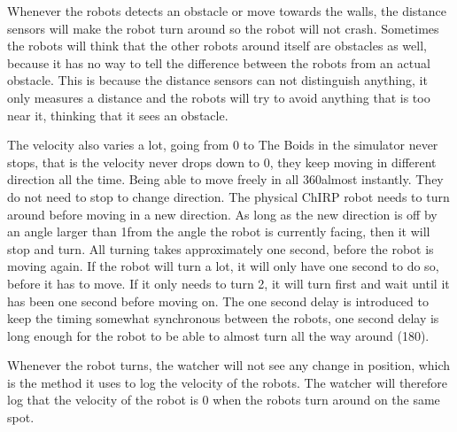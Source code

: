 Whenever the robots detects an obstacle or move towards the walls, the distance sensors will make the robot turn around so the robot will not crash. Sometimes the robots will think that the other robots around itself are obstacles as well, because it has no way to tell the difference between the robots from an actual obstacle. This is because the distance sensors can not distinguish anything, it only measures a distance and the robots will try to avoid anything that is too near it, thinking that it sees an obstacle.

The velocity also varies a lot, going from 0 to %
The Boids in the simulator never stops, that is the velocity never drops down to 0, they keep moving in different direction all the time. Being able to move freely in all 360\textdegree almost instantly. They do not need to stop to change direction.
The physical ChIRP robot needs to turn around before moving in a new direction. As long as the new direction is off by an angle larger than 1\textdegree from the angle the robot is currently facing, then it will stop and turn. All turning takes approximately one second, before the robot is moving again. If the robot will turn a lot, it will only have one second to do so, before it has to move. If it only needs to turn 2\textdegree, it will turn first and wait until it has been one second before moving on.
The one second delay is introduced to keep the timing somewhat synchronous between the robots, one second delay is long enough for the robot to be able to almost turn all the way around (180\textdegree). 

Whenever the robot turns, the watcher will not see any change in position, which is the method it uses to log the velocity of the robots. The watcher will therefore log that the velocity of the robot is 0 when the robots turn around on the same spot. 


